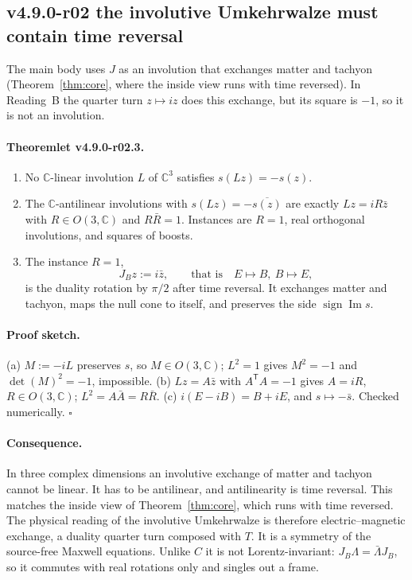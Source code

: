 \subsection*{v4.9.0-r02 the involutive Umkehrwalze must contain time reversal}
\label{subsec:v490-r02-antilinear}

The main body uses \(J\) as an involution that exchanges matter and tachyon (Theorem~\ref{thm:core}, where the inside
view runs with time reversed).  In Reading~B the quarter turn \(z\mapsto iz\) does this exchange, but its square is
\(-1\), so it is not an involution.

\paragraph{Theoremlet v4.9.0-r02.3.}
\begin{enumerate}[leftmargin=2em]
\item[(a)] No \(\mathbb C\)-linear involution \(L\) of \(\mathbb C^3\) satisfies \(s(Lz)=-s(z)\).
\item[(b)] The \(\mathbb C\)-antilinear involutions with \(s(Lz)=-\overline{s(z)}\) are exactly \(Lz=iR\bar z\) with
\(R\in O(3,\mathbb C)\) and \(R\bar R=1\).  Instances are \(R=1\), real orthogonal involutions, and squares of boosts.
\item[(c)] The instance \(R=1\),
\[
J_B z:=i\bar z,\qquad\text{that is}\quad E\mapsto B,\ B\mapsto E,
\]
is the duality rotation by \(\pi/2\) after time reversal.  It exchanges matter and tachyon, maps the null cone to
itself, and preserves the side \(\operatorname{sign}\operatorname{Im}s\).
\end{enumerate}

\paragraph{Proof sketch.}
(a) \(M:=-iL\) preserves \(s\), so \(M\in O(3,\mathbb C)\); \(L^2=1\) gives \(M^2=-1\) and \(\det(M)^2=-1\), impossible.
(b) \(Lz=A\bar z\) with \(A^{\mathsf T}A=-1\) gives \(A=iR\), \(R\in O(3,\mathbb C)\); \(L^2=A\bar A=R\bar R\).
(c) \(i(E-iB)=B+iE\), and \(s\mapsto-\bar s\).  Checked numerically.  \(\square\)

\paragraph{Consequence.}
In three complex dimensions an involutive exchange of matter and tachyon cannot be linear.  It has to be antilinear,
and antilinearity is time reversal.  This matches the inside view of Theorem~\ref{thm:core}, which runs with time
reversed.  The physical reading of the involutive Umkehrwalze is therefore electric--magnetic exchange, a duality
quarter turn composed with \(T\).  It is a symmetry of the source-free Maxwell equations.  Unlike \(C\) it is not
Lorentz-invariant: \(J_B\Lambda=\bar\Lambda J_B\), so it commutes with real rotations only and singles out a frame.

